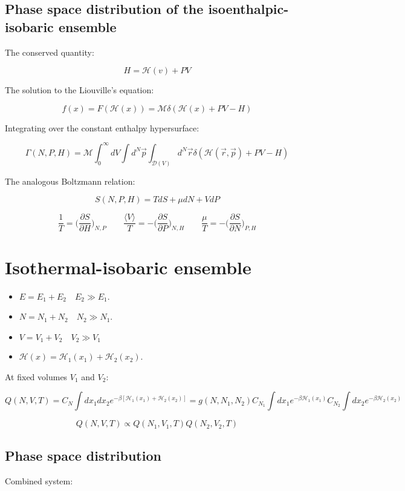 	\subsection{Phase space distribution of the isoenthalpic-isobaric ensemble}
	The conserved quantity:

	$$H = \mathcal{H}(v) + PV$$

	The solution to the Liouville's equation:

	$$f(x) = F(\mathcal{H}(x)) = \mathcal{M}\delta(\mathcal{H}(x)+PV-H)$$

	Integrating over the constant enthalpy hypersurface:

	$$\Gamma(N, P, H) = \mathcal{M}\int_0^{\infty}dV\int d^N\vec{p}\int_{\mathcal{D}(V)}d^N\vec{r}\delta(\mathcal{H}(\vec{r}, \vec{p}) + PV-H)$$

	The analogous Boltzmann relation:

	$$S(N, P, H) = TdS + \mu dN + VdP$$

	$$\frac{1}{T} = \biggl(\frac{\partial S}{\partial H}\biggr)_{N, P}\qquad \frac{\langle V\rangle}{T} = -\biggl(\frac{\partial S}{\partial P}\biggr)_{N, H}\qquad \frac{\mu}{T} = -\biggl(\frac{\partial S}{\partial N}\biggr)_{P, H}$$

\section{Isothermal-isobaric ensemble}

\begin{multicols}{2}
	\begin{itemize}
		\item $E = E_1 + E_2\quad E_2\gg E_1$.
		\item $N = N_1 + N_2\quad N_2\gg N_1$.
		\item $V = V_1 + V_2\quad V_2\gg V_1$
		\item $\mathcal{H}(x) = \mathcal{H}_1(x_1) + \mathcal{H}_2(x_2)$.
	\end{itemize}
\end{multicols}

At fixed volumes $V_1$ and $V_2$:

$$Q(N, V, T) = C_N\int dx_1dx_2 e^{-\beta[\mathcal{H}_1(x_1) + \mathcal{H}_2(x_2)]} = g(N, N_1, N_2)C_{N_1}\int dx_1 e^{-\beta\mathcal{H}_1(x_1)}C_{N_2}\int dx_2 e^{-\beta\mathcal{H}_2(x_2)}$$

$$Q(N, V, T) \propto Q(N_1, V_1, T)Q(N_2, V_2, T)$$

	\subsection{Phase space distribution}
	Combined system:

